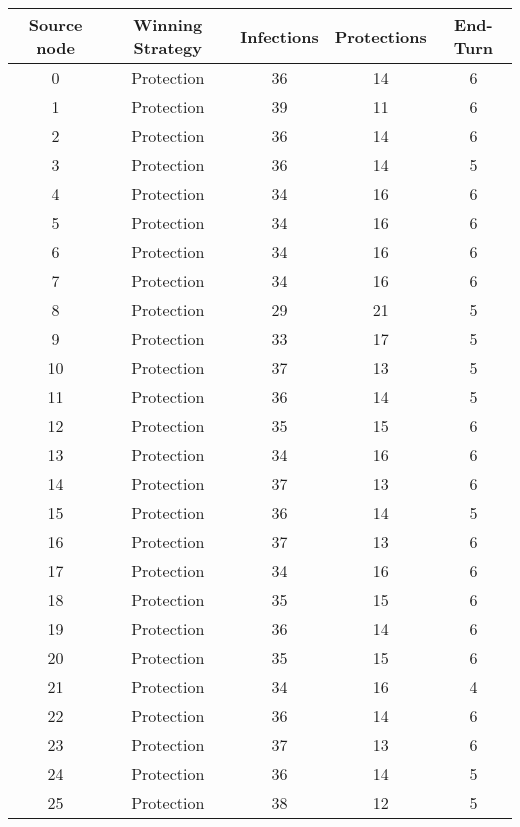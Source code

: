 \documentclass[results.tex]{subfiles}
\begin{document}
\begin{center}
  \begin{tabular}{| c || c | c | c | c |}
    \hline
    {\bfseries Source node} & {\bfseries Winning Strategy} & {\bfseries Infections} & {\bfseries Protections} & {\bfseries End-Turn} \\  %
    \hline\hline
    0 & Protection & 36 & 14 & 6 \\ 
    \hline
    1 & Protection & 39 & 11 & 6 \\ 
    \hline
    2 & Protection & 36 & 14 & 6 \\ 
    \hline
    3 & Protection & 36 & 14 & 5 \\ 
    \hline
    4 & Protection & 34 & 16 & 6 \\ 
    \hline
    5 & Protection & 34 & 16 & 6 \\ 
    \hline
    6 & Protection & 34 & 16 & 6 \\ 
    \hline
    7 & Protection & 34 & 16 & 6 \\ 
    \hline
    8 & Protection & 29 & 21 & 5 \\ 
    \hline
    9 & Protection & 33 & 17 & 5 \\ 
    \hline
    10 & Protection & 37 & 13 & 5 \\ 
    \hline
    11 & Protection & 36 & 14 & 5 \\ 
    \hline
    12 & Protection & 35 & 15 & 6 \\ 
    \hline
    13 & Protection & 34 & 16 & 6 \\ 
    \hline
    14 & Protection & 37 & 13 & 6 \\ 
    \hline
    15 & Protection & 36 & 14 & 5 \\ 
    \hline
    16 & Protection & 37 & 13 & 6 \\ 
    \hline
    17 & Protection & 34 & 16 & 6 \\ 
    \hline
    18 & Protection & 35 & 15 & 6 \\ 
    \hline
    19 & Protection & 36 & 14 & 6 \\ 
    \hline
    20 & Protection & 35 & 15 & 6 \\ 
    \hline
    21 & Protection & 34 & 16 & 4 \\ 
    \hline
    22 & Protection & 36 & 14 & 6 \\ 
    \hline
    23 & Protection & 37 & 13 & 6 \\ 
    \hline
    24 & Protection & 36 & 14 & 5 \\ 
    \hline
    25 & Protection & 38 & 12 & 5 \\ 

\end{tabular}
\end{center}
\end{document}
